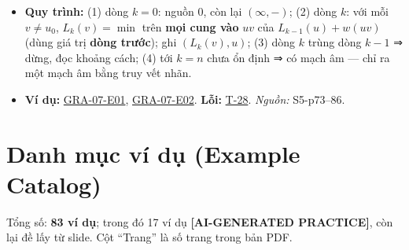 \documentclass[
  10pt,
  twoside,openany]{book}
\providecommand{\tightlist}{%
  \setlength{\itemsep}{0pt}\setlength{\parskip}{0pt}}
\begin{document}
\begin{itemize}
\tightlist
\item
  \textbf{Quy trình:} (1) dòng \(k=0\): nguồn 0, còn lại \((\infty,-)\);
  (2) dòng \(k\): với mỗi \(v\ne u_0\), \(L_k(v)=\min\) trên \textbf{mọi
  cung vào} \(uv\) của \(L_{k-1}(u)+w(uv)\) (dùng giá trị \textbf{dòng
  trước}); ghi \((L_k(v),u)\); (3) dòng \(k\) trùng dòng \(k-1\) ⇒ dừng,
  đọc khoảng cách; (4) tới \(k=n\) chưa ổn định ⇒ có mạch âm --- chỉ ra
  một mạch âm bằng truy vết nhãn.
\item
  \textbf{Ví dụ:} \protect\hyperlink{GRA-07-E01}{GRA-07-E01},
  \protect\hyperlink{GRA-07-E02}{GRA-07-E02}. \textbf{Lỗi:}
  \protect\hyperlink{T-28}{T-28}. \emph{Nguồn:} S5-p73--86.
\end{itemize}

\hypertarget{catalog}{%
\chapter{Danh mục ví dụ (Example Catalog)}\label{catalog}}

Tổng số: \textbf{83 ví dụ}; trong đó 17 ví dụ \textbf{{[}AI-GENERATED
PRACTICE{]}}, còn lại đề lấy từ slide. Cột ``Trang'' là số trang trong
bản PDF.
\end{document}
